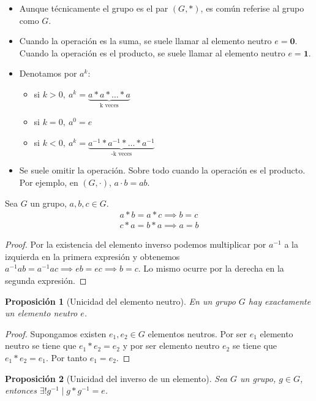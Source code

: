 \documentclass{book}
\newtheorem{pro}{Proposición}
\theoremstyle{definition}
\theoremstyle{remark}
\newcommand{\inv}[1]{#1^{-1}}
\begin{document}
\begin{itemize}
	\item Aunque técnicamente el grupo es el par $(G, \ast)$, es común referise al grupo como $G$.
	\item Cuando la operación es la suma, se suele llamar al elemento neutro $e = \mathbf{0}$. Cuando la operación es el producto, se suele llamar al elemento neutro $e = \mathbf{1}$.
	\item Denotamos por $a^k$:
	\begin{itemize}
		\item si $k > 0,\ a^k = \underbrace{a \ast a \ast \dots \ast a}_\text{k veces}$
		\item si $k = 0,\ a^0 = e$
		\item si $k < 0,\ a^k = \underbrace{\inv{a} \ast \inv{a} \ast \dots \ast \inv{a}}_\text{-k veces}$
	\end{itemize}
	\item Se suele omitir la operación. Sobre todo cuando la operación es el producto. Por ejemplo, en $(G, \cdot)$, $a \cdot b = ab$.
\end{itemize}

\begin{thm}
	Sea $G$ un grupo, $a, b, c \in G$.
	\begin{align}
		a \ast b = a \ast c \implies b = c \\
		c \ast a = b \ast a \implies a = b
	\end{align}
\end{thm}

\begin{proof}
	Por la existencia del elemento inverso podemos multiplicar por $\inv{a}$ a la izquierda en la primera expresión y obtenemos $\inv{a} a b = \inv{a} a c \implies e b = e c \implies b = c$. Lo mismo ocurre por la derecha en la segunda expresión.
\end{proof}

\begin{pro}[Unicidad del elemento neutro]
	En un grupo $G$ hay exactamente un elemento neutro $e$.
\end{pro}

\begin{proof}
	Supongamos existen $e_1, e_2 \in G$ elementos neutros. Por ser $e_1$ elemento neutro se tiene que $e_1 \ast e_2 = e_2$ y por ser elemento neutro $e_2$ se tiene que $e_1 \ast e_2 = e_1$. Por tanto $e_1 = e_2$.
\end{proof}

\begin{pro}[Unicidad del inverso de un elemento]
	Sea $G$ un grupo, $g \in G$, entonces $\exists! \inv{g} \mid g \ast \inv{g} = e$. 
\end{pro}
\end{document}
